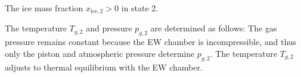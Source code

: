 The ice mass fraction \( x_{\text{ice},2} > 0 \) in state 2.  

The temperature \( T_{g,2} \) and pressure \( p_{g,2} \) are determined as follows:  
The gas pressure remains constant because the EW chamber is incompressible, and thus only the piston and atmospheric pressure determine \( p_{g,2} \).  
The temperature \( T_{g,2} \) adjusts to thermal equilibrium with the EW chamber.